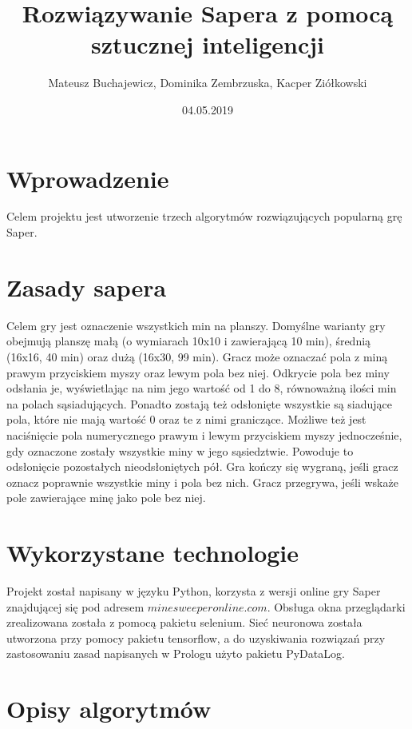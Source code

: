 \documentclass[letterpaper,12pt]{article}
\begin{document}
\title{Rozwiązywanie Sapera z pomocą sztucznej inteligencji}
\date{04.05.2019}
\author{ Mateusz Buchajewicz, Dominika Zembrzuska, Kacper Ziółkowski}
\maketitle

\section{Wprowadzenie}
Celem projektu jest utworzenie trzech algorytmów rozwiązujących popularną grę Saper.\\
\hfill \break
\section{Zasady sapera}
Celem gry jest oznaczenie wszystkich min na planszy. Domyślne warianty gry obejmują
planszę małą (o wymiarach 10x10 i zawierającą 10 min), średnią (16x16, 40 min)
oraz dużą (16x30, 99 min). Gracz może oznaczać pola z miną prawym przyciskiem
myszy oraz lewym pola bez niej. Odkrycie pola bez miny odsłania je,
wyświetlając na nim jego wartość od 1 do 8, równoważną ilości
min na polach sąsiadujących. Ponadto zostają też odsłonięte wszystkie są
siadujące pola, które nie mają wartość 0 oraz te z nimi graniczące. Możliwe też jest 
naciśnięcie pola numerycznego prawym i lewym przyciskiem myszy jednocześnie, gdy oznaczone
zostały wszystkie miny w jego sąsiedztwie. Powoduje to odsłonięcie pozostałych nieodsłoniętych pół.
Gra kończy się wygraną, jeśli gracz oznacz poprawnie wszystkie miny i pola bez nich.
Gracz przegrywa, jeśli wskaże pole zawierające minę jako pole bez niej.\\
\hfill \break

\section{Wykorzystane technologie}
Projekt został napisany w języku Python, korzysta z wersji online gry Saper znajdującej się pod adresem $minesweeperonline.com$. Obsługa okna przeglądarki zrealizowana 
została z pomocą pakietu selenium. Sieć neuronowa została utworzona przy pomocy pakietu tensorflow, a do uzyskiwania rozwiązań przy zastosowaniu zasad napisanych w Prologu
użyto pakietu PyDataLog.
\newpage
\section{Opisy algorytmów}
\end{document}
